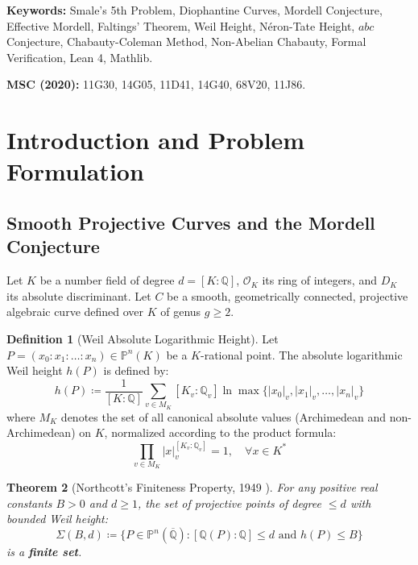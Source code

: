 \documentclass[11pt,a4paper]{article}
\newtheorem{theorem}{Theorem}[section]
\theoremstyle{definition}
\newtheorem{definition}[theorem]{Definition}
\begin{document}
\vspace{0.5em}
\noindent\textbf{Keywords:} Smale's 5th Problem, Diophantine Curves, Mordell Conjecture, Effective Mordell, Faltings' Theorem, Weil Height, Néron-Tate Height, $abc$ Conjecture, Chabauty-Coleman Method, Non-Abelian Chabauty, Formal Verification, Lean 4, Mathlib.

\noindent\textbf{MSC (2020):} 11G30, 14G05, 11D41, 14G40, 68V20, 11J86.

\tableofcontents
\newpage

\section{Introduction and Problem Formulation}

\subsection{Smooth Projective Curves and the Mordell Conjecture}
Let $K$ be a number field of degree $d = [K : \mathbb{Q}]$, $\mathcal{O}_K$ its ring of integers, and $D_K$ its absolute discriminant. Let $C$ be a smooth, geometrically connected, projective algebraic curve defined over $K$ of genus $g \ge 2$.

\begin{definition}[Weil Absolute Logarithmic Height]\label{def:weil_height}
Let $P = (x_0 : x_1 : \dots : x_n) \in \mathbb{P}^n(K)$ be a $K$-rational point. The absolute logarithmic Weil height $h(P)$ is defined by:
\begin{equation}\label{eq:weil_height}
h(P) \coloneqq \frac{1}{[K : \mathbb{Q}]} \sum_{v \in M_K} [K_v : \mathbb{Q}_v] \ln \max \{ |x_0|_v, |x_1|_v, \dots, |x_n|_v \}
\end{equation}
where $M_K$ denotes the set of all canonical absolute values (Archimedean and non-Archimedean) on $K$, normalized according to the product formula:
\begin{equation}\label{eq:product_formula}
\prod_{v \in M_K} |x|_v^{[K_v : \mathbb{Q}_v]} = 1, \quad \forall x \in K^*
\end{equation}
\end{definition}

\begin{theorem}[Northcott's Finiteness Property, 1949 \cite{northcott1949}]\label{thm:northcott}
For any positive real constants $B > 0$ and $d \ge 1$, the set of projective points of degree $\le d$ with bounded Weil height:
\begin{equation}\label{eq:northcott_set}
\Sigma(B, d) \coloneqq \{ P \in \mathbb{P}^n(\overline{\mathbb{Q}}) : [\mathbb{Q}(P) : \mathbb{Q}] \le d \text{ and } h(P) \le B \}
\end{equation}
is a \textbf{finite set}.
\end{theorem}
\end{document}
